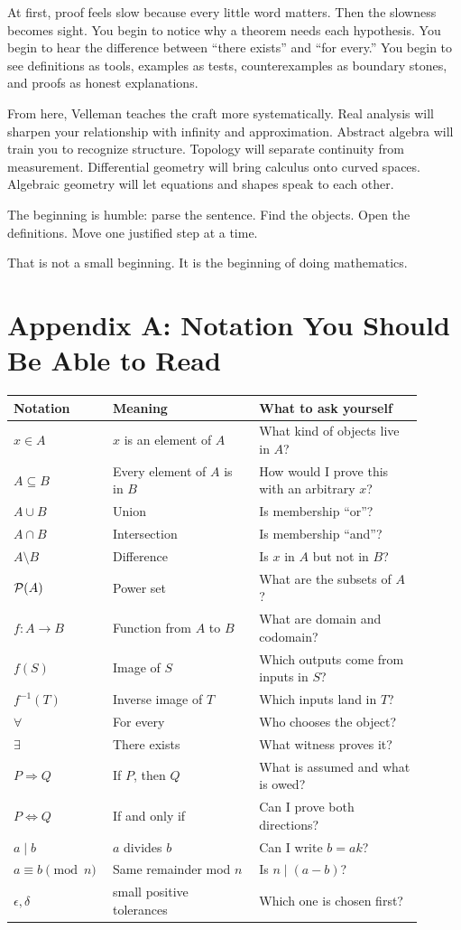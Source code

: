 \documentclass[11pt]{article}
\begin{document}
At first, proof feels slow because every little word matters. Then the slowness becomes sight. You begin to notice why a theorem needs each hypothesis. You begin to hear the difference between ``there exists'' and ``for every.'' You begin to see definitions as tools, examples as tests, counterexamples as boundary stones, and proofs as honest explanations.

From here, Velleman teaches the craft more systematically. Real analysis will sharpen your relationship with infinity and approximation. Abstract algebra will train you to recognize structure. Topology will separate continuity from measurement. Differential geometry will bring calculus onto curved spaces. Algebraic geometry will let equations and shapes speak to each other.

The beginning is humble: parse the sentence. Find the objects. Open the definitions. Move one justified step at a time.

That is not a small beginning. It is the beginning of doing mathematics.

\newpage
\appendix
\section{Appendix A: Notation You Should Be Able to Read}

\begin{longtable}{p{0.18\linewidth}p{0.34\linewidth}p{0.38\linewidth}}
\toprule
Notation & Meaning & What to ask yourself \\
\midrule
$x\in A$ & $x$ is an element of $A$ & What kind of objects live in $A$? \\
$A\subseteq B$ & Every element of $A$ is in $B$ & How would I prove this with an arbitrary $x$? \\
$A\cup B$ & Union & Is membership ``or''? \\
$A\cap B$ & Intersection & Is membership ``and''? \\
$A\setminus B$ & Difference & Is $x$ in $A$ but not in $B$? \\
$\mathcal{P}(A)$ & Power set & What are the subsets of $A$? \\
$f:A\to B$ & Function from $A$ to $B$ & What are domain and codomain? \\
$f(S)$ & Image of $S$ & Which outputs come from inputs in $S$? \\
$f^{-1}(T)$ & Inverse image of $T$ & Which inputs land in $T$? \\
$\forall$ & For every & Who chooses the object? \\
$\exists$ & There exists & What witness proves it? \\
$P\Rightarrow Q$ & If $P$, then $Q$ & What is assumed and what is owed? \\
$P\Leftrightarrow Q$ & If and only if & Can I prove both directions? \\
$a\mid b$ & $a$ divides $b$ & Can I write $b=ak$? \\
$a\equiv b\pmod n$ & Same remainder mod $n$ & Is $n\mid(a-b)$? \\
$\epsilon,\delta$ & small positive tolerances & Which one is chosen first? \\
\bottomrule
\end{longtable}
\end{document}
